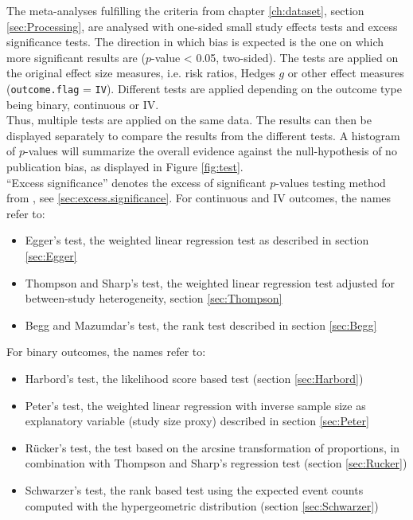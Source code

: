 \documentclass[11pt,a4paper,twoside]{book}\usepackage[]{graphicx}\usepackage[]{color}
\begin{document}
The meta-analyses fulfilling the criteria from chapter \ref{ch:dataset}, section \ref{sec:Processing}, are analysed with one-sided small study effects tests and excess significance tests. The direction in which bias is expected is the one on which more significant results are ($p$-value < 0.05, two-sided). The tests are applied on the original effect size measures, i.e. risk ratios, Hedges $g$ or other effect measures (\texttt{outcome.flag} = \texttt{IV}). Different tests are applied depending on the outcome type being binary, continuous or IV.\\
Thus, multiple tests are applied on the same data. The results can then be displayed separately to compare the results from the different tests. A histogram of $p$-values will summarize the overall evidence against the null-hypothesis of no publication bias, as displayed in Figure \ref{fig:test}. \\
``Excess significance'' denotes the excess of significant $p$-values testing method from \citet{excess.significance}, see \ref{sec:excess.significance}. For continuous and IV outcomes, the names refer to: 

\begin{itemize}
\item Egger's test, the weighted linear regression test as described in section \ref{sec:Egger}
\item Thompson and Sharp's test, the weighted linear regression test adjusted for between-study heterogeneity, section \ref{sec:Thompson}
\item Begg and Mazumdar's test, the rank test described in section \ref{sec:Begg}
\end{itemize}

For binary outcomes, the names refer to:
\begin{itemize}
\item Harbord's test, the likelihood score based test (section \ref{sec:Harbord})
\item Peter's test, the weighted linear regression with inverse sample size as explanatory variable (study size proxy) described in section \ref{sec:Peter}
\item R\"ucker's test, the test based on the arcsine transformation of proportions, in combination with Thompson and Sharp's regression test (section \ref{sec:Rucker})
\item Schwarzer's test, the rank based test using the expected event counts computed with the hypergeometric distribution (section \ref{sec:Schwarzer})
\end{itemize}
\end{document}
